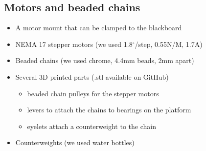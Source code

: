\documentclass[12pt]{article}
\begin{document}
\subsection*{Motors and beaded chains}
\begin{itemize}
  \item A motor mount that can be clamped to the blackboard
  \item NEMA 17 stepper motors (we used 1.8$^\circ$/step, 0.55N/M, 1.7A)
  \item Beaded chains (we used chrome, 4.4mm beads, 2mm apart)
  \item Several 3D printed parts (.stl available on GitHub)
  \begin{itemize}
    \item beaded chain pulleys for the stepper motors
    \item levers to attach the chains to bearings on the platform
    \item eyelets attach a counterweight to the chain
  \end{itemize}
  \item Counterweights (we used water bottles)
\end{itemize}
\end{document}
